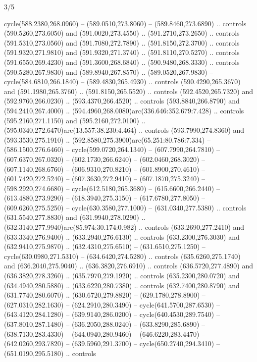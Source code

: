 \begin{flagdescription}{3/5}
\begin{scope}[xshift=0.5\flaglength,yshift=0.5\flagwidth,scale=\flagwidth/602.3]
\begin{scope}[y=0.8pt, x=0.8pt, yscale=-1, shift={(-600,-330)}]
  cycle(588.2380,268.0960) -- (589.0510,273.8060) -- (589.8460,273.6890) ..
  controls (590.5260,273.6050) and (591.0020,273.4550) .. (591.2710,273.2650) ..
  controls (591.5310,273.0560) and (591.7080,272.7890) .. (591.8150,272.3700) ..
  controls (591.9320,271.9810) and (591.9320,271.3740) .. (591.8110,270.5270) ..
  controls (591.6550,269.4230) and (591.3600,268.6840) .. (590.9480,268.3330) ..
  controls (590.5280,267.9830) and (589.8940,267.8570) .. (589.0520,267.9830) --
  cycle(584.6810,266.1840) -- (589.4830,265.4930) .. controls
  (590.4290,265.3670) and (591.1980,265.3760) .. (591.8150,265.5520) .. controls
  (592.4520,265.7320) and (592.9760,266.0230) .. (593.4370,266.4520) .. controls
  (593.8840,266.8790) and (594.2410,267.4000) ..
  (594.4960,268.0080)arc(336.646:352.679:7.428) .. controls (595.2160,271.1150)
  and (595.2160,272.0100) .. (595.0340,272.6470)arc(13.557:38.230:4.464) ..
  controls (593.7990,274.8360) and (593.3530,275.1910) ..
  (592.8580,275.3900)arc(65.251:80.786:7.334) -- (586.1500,276.6460) --
  cycle(599.0720,264.1340) -- (607.7990,264.7810) -- (607.6370,267.0320) --
  (602.1730,266.6240) -- (602.0460,268.3020) -- (607.1140,268.6760) --
  (606.9310,270.8210) -- (601.8900,270.4610) -- (601.7420,272.5240) --
  (607.3630,272.9410) -- (607.1870,275.3240) -- (598.2920,274.6680) --
  cycle(612.5180,265.3680) -- (615.6600,266.2440) -- (613.4880,273.9290) --
  (618.3940,275.3150) -- (617.6780,277.8050) -- (609.6260,275.5250) --
  cycle(630.3580,277.1000) -- (631.0340,277.5380) .. controls
  (631.5540,277.8830) and (631.9940,278.0290) ..
  (632.3140,277.9940)arc(85.974:30.174:0.982) .. controls (633.2690,277.2410)
  and (633.3340,276.9400) .. (633.2940,276.6130) .. controls (633.2300,276.3030)
  and (632.9410,275.9870) .. (632.4310,275.6510) -- (631.6510,275.1250) --
  cycle(630.0980,271.5310) -- (634.6420,274.5280) .. controls
  (635.6260,275.1740) and (636.2040,275.9040) .. (636.3820,276.6910) .. controls
  (636.5720,277.4890) and (636.3820,278.3260) .. (635.7970,279.1920) .. controls
  (635.2300,280.0720) and (634.4940,280.5880) .. (633.6220,280.7380) .. controls
  (632.7400,280.8790) and (631.7740,280.6070) .. (630.6720,279.8820) --
  (629.1780,278.8900) -- (627.0310,282.1630) -- (624.2910,280.3490) --
  cycle(641.5700,287.6530) -- (643.4120,284.1280) -- (639.9140,286.0200) --
  cycle(640.4530,289.7540) -- (637.8010,287.1480) -- (636.2050,288.0240) --
  (633.8290,285.6890) -- (638.7130,283.4330) -- (644.0940,280.9460) --
  (646.6220,283.4470) -- (642.0260,293.7820) -- (639.5960,291.3700) --
  cycle(650.2740,294.3410) -- (651.0190,295.5180) .. controls

\end{scope}
\end{scope}
\end{flagdescription}
